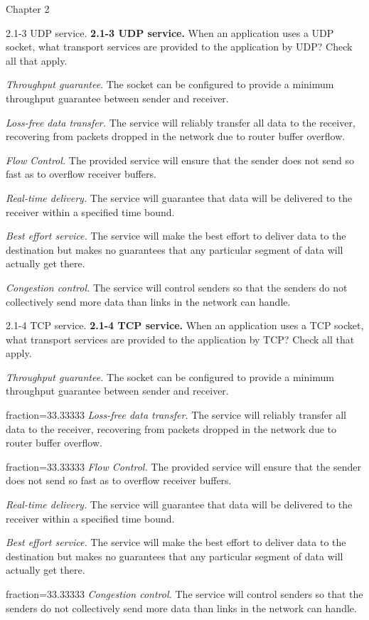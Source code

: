\documentclass[a4paper]{article}
\begin{document}
\begin{quiz}{Chapter 2}
\begin{multi}[points=1,shuffle,multiple]{2.1-3 UDP service.}
\textbf{2.1-3 UDP service.} When an application uses a UDP socket, what transport services are provided to the application by UDP? Check all that apply.
\item \emph{Throughput guarantee}. The socket can be configured to provide a minimum throughput guarantee between sender and receiver.
\item \emph{Loss-free data transfer.} The service will reliably transfer all data to the receiver, recovering from packets dropped in the network due to router buffer overflow.
\item \emph{Flow Control.} The provided service will ensure that the sender does not send so fast as to overflow receiver buffers.
\item \emph{Real-time delivery.} The service will guarantee that data will be delivered to the receiver within a specified time bound.
\item* \emph{Best effort service.} The service will make the best effort to deliver data to the destination but makes no guarantees that any particular segment of data will actually get there.
\item \emph{Congestion control.} The service will control senders so that the senders do not collectively send more data than links in the network can handle.
\end{multi}

\begin{multi}[points=1,shuffle,multiple]{2.1-4 TCP service.}
\textbf{2.1-4 TCP service.} When an application uses a TCP socket, what transport services are provided to the application by TCP? Check all that apply.
\item \emph{Throughput guarantee.} The socket can be configured to provide a minimum throughput guarantee between sender and receiver.
\item[fraction=33.33333] \emph{Loss-free data transfer.} The service will reliably transfer all data to the receiver, recovering from packets dropped in the network due to router buffer overflow.
\item[fraction=33.33333] \emph{Flow Control.} The provided service will ensure that the sender does not send so fast as to overflow receiver buffers.
\item \emph{Real-time delivery.} The service will guarantee that data will be delivered to the receiver within a specified time bound.
\item \emph{Best effort service.} The service will make the best effort to deliver data to the destination but makes no guarantees that any particular segment of data will actually get there.
\item[fraction=33.33333] \emph{Congestion control.} The service will control senders so that the senders do not collectively send more data than links in the network can handle.
\end{multi}


\end{quiz}
\end{document}
